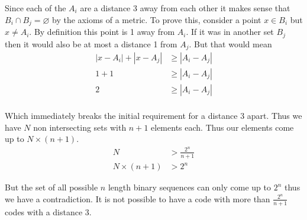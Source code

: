 \documentclass{article}
\begin{document}
Since each of the $A_i$ are a distance 3 away from each other it makes sense
that $B_i \cap B_j = \varnothing$ by the axioms of a metric. To prove this,
consider a point $x \in B_i$ but $x \neq A_i$.
By definition this point is 1 away from $A_i$. If it was in another set $B_j$
then it would also be at most a distance 1 from $A_j$. But that would mean
\begin{align*}
    |x - A_i| + |x - A_j| &\geq |A_i - A_j| \\
    1 + 1 &\geq |A_i - A_j| \\
    2 &\geq |A_i - A_j| \\
\end{align*}

Which immediately breaks the initial requirement for a distance 3 apart. Thus
we have $N$ non intersecting sets with $n + 1$ elements each. Thus our elements
come up to $N \times (n+1)$.
\begin{align*}
    N &> \frac{2^n}{n+1} \\
    N\times(n+1) &> 2^n
\end{align*}

But the set of all possible $n$ length binary sequences can only come up to
$2^n$ thus we have a contradiction. It is not possible to have a code with more
than $\frac{2^n}{n+1}$ codes with a distance 3.
\end{document}
